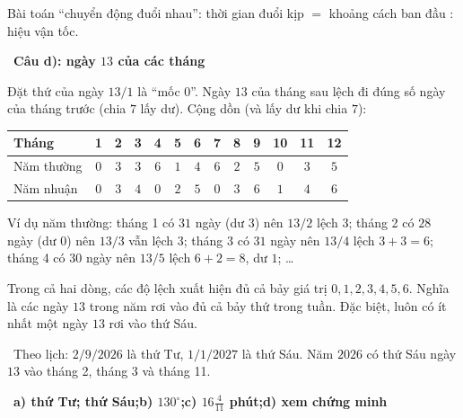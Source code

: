 \documentclass[11pt]{article}
\providecommand{\AnsWord}{Đáp số}
\newcommand{\ans}[1]{\par\smallskip{\bfseries\color{tmGreen!88!black}\AnsWord:}\ {\bfseries\color{AnsRed}#1}\par}
\newcommand{\step}[2]{\par\smallskip\noindent{\bfseries\color{tmBlue!85!black}\StepWord~#1.}\ {\bfseries #2}\par\nopagebreak}
\newcommand{\verify}[1]{\par\smallskip\noindent{\bfseries\color{tmGreen!80!black}\faCheckCircle\ \CheckWord}\ #1\par}
\def\AnsWord{Đáp số}
\def\StepWord{Bước}
\def\CheckWord{Thử lại:}
\begin{document}
{\begin{recallbox}Bài toán ``chuyển động đuổi nhau'': thời gian đuổi kịp $=$ khoảng cách ban đầu $:$ hiệu vận tốc.\end{recallbox}
\step{5}{Câu d): ngày $13$ của các tháng}
Đặt thứ của ngày $13/1$ là ``mốc $0$''. Ngày $13$ của tháng sau lệch đi đúng số ngày của tháng trước (chia $7$ lấy dư). Cộng dồn
(và lấy dư khi chia $7$):
\begin{center}\scriptsize
\setlength{\tabcolsep}{3.2pt}
\begin{tabular}{|l|c|c|c|c|c|c|c|c|c|c|c|c|}
\hline
\rowcolor{tmBlue!10} Tháng & 1 & 2 & 3 & 4 & 5 & 6 & 7 & 8 & 9 & 10 & 11 & 12\\ \hline
Năm thường & $0$ & $3$ & $3$ & $6$ & $1$ & $4$ & $6$ & $2$ & $5$ & $0$ & $3$ & $5$\\ \hline
Năm nhuận & $0$ & $3$ & $4$ & $0$ & $2$ & $5$ & $0$ & $3$ & $6$ & $1$ & $4$ & $6$\\ \hline
\end{tabular}
\end{center}
Ví dụ năm thường: tháng 1 có $31$ ngày (dư $3$) nên $13/2$ lệch $3$; tháng 2 có $28$ ngày (dư $0$) nên $13/3$ vẫn lệch $3$; tháng 3 có
$31$ ngày nên $13/4$ lệch $3 + 3 = 6$; tháng 4 có $30$ ngày nên $13/5$ lệch $6 + 2 = 8$, dư $1$; \dots
\begin{proofbox}Trong cả hai dòng, các độ lệch xuất hiện đủ cả bảy giá trị $0, 1, 2, 3, 4, 5, 6$. Nghĩa là các ngày $13$ trong năm rơi
vào đủ cả bảy thứ trong tuần. Đặc biệt, luôn có ít nhất một ngày $13$ rơi vào thứ Sáu.\end{proofbox}
\verify{Theo lịch: $2/9/2026$ là thứ Tư, $1/1/2027$ là thứ Sáu. Năm $2026$ có thứ Sáu ngày $13$ vào tháng 2, tháng 3 và tháng 11.}
\ans{a) thứ Tư; thứ Sáu;\quad b) $130^\circ$;\quad c) $16\frac{4}{11}$ phút;\quad d) xem chứng minh}
}
\end{document}
